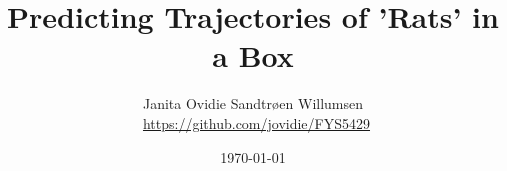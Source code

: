 \documentclass[reprint,english,notitlepage,nofootinbib]{revtex4-1}  %
\begin{document}
% 


% 
\title{Predicting Trajectories of 'Rats' in a Box}
\author{Janita Ovidie Sandtrøen Willumsen \\ \faGithub \, \url{https://github.com/jovidie/FYS5429}}        
\date{\today}
\noaffiliation


\maketitle


% 


% 

% 
% 
% 
% 
 
\newpage 


% 

\end{document}
